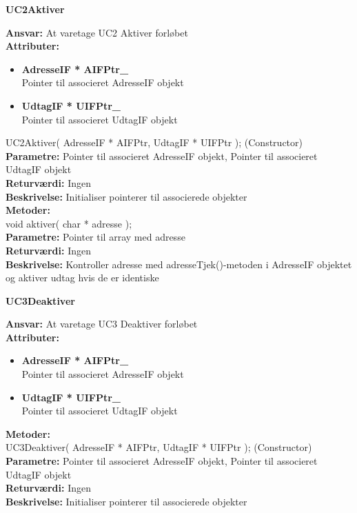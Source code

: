 %
%
{\centering
\textbf{UC2Aktiver}\par
}
\textbf{Ansvar:} At varetage UC2 Aktiver forløbet \\
\textbf{Attributer:}
\begin{itemize}
	\item \textbf{AdresseIF * AIFPtr\_} \\
	Pointer til associeret AdresseIF objekt
	\item \textbf{UdtagIF * UIFPtr\_} \\
	Pointer til associeret UdtagIF objekt
\end{itemize}
UC2Aktiver( AdresseIF * AIFPtr, UdtagIF * UIFPtr ); (Constructor) \\
\textbf{Parametre:} Pointer til associeret AdresseIF objekt, Pointer til associeret UdtagIF objekt \\
\textbf{Returværdi:} Ingen \\
\textbf{Beskrivelse:} Initialiser pointerer til associerede objekter \\

\textbf{Metoder:} \\
void aktiver( char * adresse ); \\
\textbf{Parametre:} Pointer til array med adresse \\
\textbf{Returværdi:} Ingen \\
\textbf{Beskrivelse:} Kontroller adresse med adresseTjek()-metoden i AdresseIF objektet og aktiver udtag hvis de er identiske \\

%
%
{\centering
\textbf{UC3Deaktiver}\par
}
\textbf{Ansvar:} At varetage UC3 Deaktiver forløbet \\
\textbf{Attributer:}
\begin{itemize}
	\item \textbf{AdresseIF * AIFPtr\_} \\
	Pointer til associeret AdresseIF objekt
	\item \textbf{UdtagIF * UIFPtr\_} \\
	Pointer til associeret UdtagIF objekt
\end{itemize}
\textbf{Metoder:} \\
UC3Deaktiver( AdresseIF * AIFPtr, UdtagIF * UIFPtr ); (Constructor) \\
\textbf{Parametre:} Pointer til associeret AdresseIF objekt, Pointer til associeret UdtagIF objekt \\
\textbf{Returværdi:} Ingen \\
\textbf{Beskrivelse:} Initialiser pointerer til associerede objekter \\

